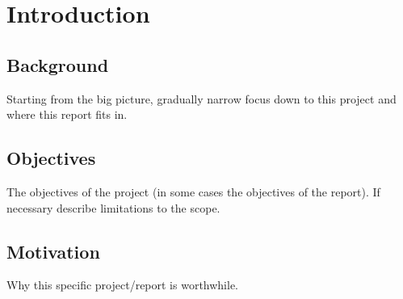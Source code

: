 \chapter{Introduction}

\section{Background}

Starting from the big picture, gradually narrow focus down to this project and where this report fits in.

\section{Objectives}

The objectives of the project (in some cases the objectives of the report). If necessary describe limitations to the scope.

\section{Motivation}

Why this specific project/report is worthwhile.

